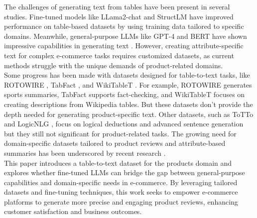 The challenges of generating text from tables have been present in several studies. Fine-tuned models like LLama2-chat \citep{jiang2023mistral} and StructLM \citep{gao2024jsontuning} have improved performance on table-based datasets by using training data tailored to specific domains. Meanwhile, general-purpose LLMs like GPT-4 and BERT have shown impressive capabilities in generating text \citep{openai2024gpt4technicalreport, devlin2019bertpretrainingdeepbidirectional}. However, creating attribute-specific text for complex e-commerce tasks requires customized datasets, as current methods struggle with the unique demands of product-related domains.
\\

Some progress has been made with datasets designed for table-to-text tasks, like ROTOWIRE \citep{wiseman2017challengesdatatodocumentgeneration}, TabFact \citep{2019TabFactA}, and WikiTableT \citep{chen2021wikitabletlargescaledatatotextdataset}. For example, ROTOWIRE generates sports summaries, TabFact supports fact-checking, and WikiTableT focuses on creating descriptions from Wikipedia tables. But these datasets don't provide the depth needed for generating product-specific text. Other datasets, such as ToTTo \citep{parikh2020tottocontrolledtabletotextgeneration} and LogicNLG \citep{chen2020logicalnaturallanguagegeneration}, focus on logical deductions and advanced sentence generation but they still not significant for product-related tasks. The growing need for domain-specific datasets tailored to product reviews and attribute-based summaries has been underscored by recent research \citep{He2023ReviewOS}.
\\

This paper introduces a table-to-text dataset for the products domain and explores whether fine-tuned LLMs can bridge the gap between general-purpose capabilities and domain-specific needs in e-commerce. By leveraging tailored datasets and fine-tuning techniques, this work seeks to empower e-commerce platforms to generate more precise and engaging product reviews, enhancing customer satisfaction and business outcomes.
